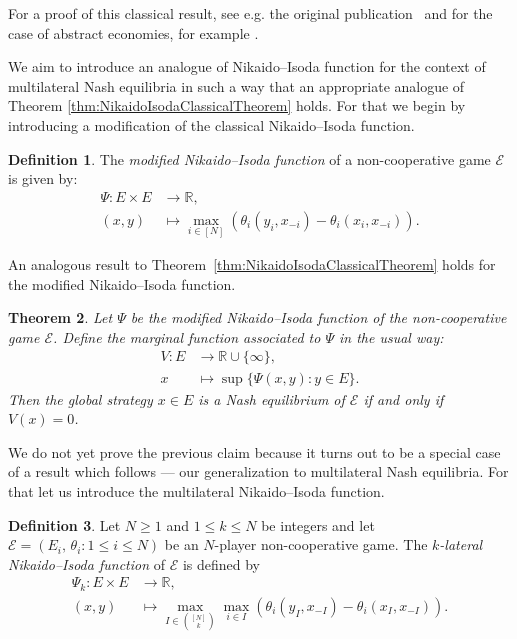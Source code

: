 \documentclass[a4paper,11pt,reqno,english]{amsart}
\theoremstyle{plain}
\newtheorem{theorem}{Theorem}[section]
\theoremstyle{definition}
\newtheorem{definition}[theorem]{Definition}
\newcommand{\Ecal}{\mathcal{E}}
\begin{document}
\medskip
For a proof of this classical result, see e.g. the original publication~\cite{NikaidoIsoda1955} and for the case of abstract economies, for example \cite[Thm.\,1]{FacchineiKanzow2007}.

\medskip
We aim to introduce an analogue of Nikaido--Isoda function for the context of multilateral Nash equilibria in such a way that an appropriate analogue of Theorem \ref{thm:NikaidoIsodaClassicalTheorem} holds.
For that we begin by introducing a modification of the classical Nikaido--Isoda function.

\begin{definition}
	The {\em  modified Nikaido--Isoda function} of a non-cooperative game $\Ecal$ is given by:
	\begin{align*}
		\Psi\colon E\times E & \longrightarrow \mathbb{R} ,                                                          \\
		(x,y)                & \longmapsto \max_{i\in[N]} \left(\theta_i(y_i,x_{-i}) - \theta_i(x_i, x_{-i})\right).
	\end{align*}
\end{definition}

\medskip
An analogous result to Theorem~\ref{thm:NikaidoIsodaClassicalTheorem} holds for the modified Nikaido--Isoda function.

\begin{theorem}\label{thm:ModifiedNikaidoIsoda}
	Let $\Psi$ be the modified Nikaido--Isoda function of the non-cooperative game $\Ecal$.
	Define the marginal function associated to $\Psi$ in the usual way:
	\begin{align*}
		V\colon E & \longrightarrow \mathbb{R} \cup \{\infty\}, \\
		x         & \longmapsto \sup\{\Psi(x,y) : y\in E\}.
	\end{align*}
	Then the global strategy $x\in E$ is a Nash equilibrium of $\Ecal$ if and only if $V(x) = 0$.
\end{theorem}

\medskip
We do not yet prove the previous claim because it turns out to be a special case of a result which follows --- our generalization to multilateral Nash equilibria.
For that let us introduce the multilateral Nikaido--Isoda function.

\begin{definition}\label{def:MultilateralNikaidoIsoda}
	Let $N\geq 1$ and $1\leq k\leq N$ be integers and let $\Ecal=(E_i,\,\theta_i : 1\leq i\leq N)$ be an $N$-player non-cooperative game.
	The {\em $k$-lateral Nikaido--Isoda function} of $\Ecal$ is defined by
	\begin{align*}
		\Psi_k\colon E\times E & \longrightarrow \mathbb{R},                                                                                   \\
		(x, y)                 & \longmapsto \max_{I\in\binom{[N]}{k}}\max_{i\in I}\left(\theta_i(y_I, x_{-I}) - \theta_i(x_I, x_{-I})\right).
	\end{align*}
\end{definition}
\end{document}

